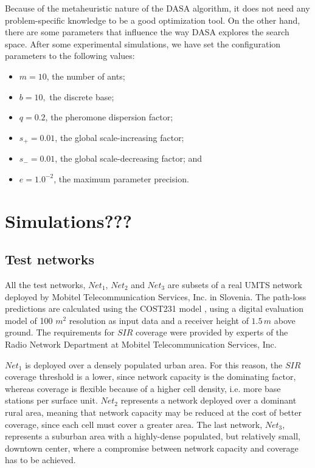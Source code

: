 Because of the metaheuristic nature of the DASA algorithm, it does
not need any problem-specific knowledge to be a good optimization
tool. On the other hand, there are some parameters that influence
the way DASA explores the search space. After some experimental simulations,
we have set the configuration parameters to the following values:
\begin{itemize}
\item $m=10$, the number of ants;
\item $b=10,$ the discrete base;
\item $q=0.2$, the pheromone dispersion factor;
\item $s_{+}=0.01$, the global scale-increasing factor;
\item $s_{-}=0.01$, the global scale-decreasing factor; and 
\item $e=1.0^{-2}$, the maximum parameter precision.
\end{itemize}

\section{Simulations???}


\subsection{Test networks}

All the test networks, $Net_{1}$, $Net_{2}$ and $Net_{3}$ are subsets
of a real UMTS network deployed by Mobitel Telecommunication Services,
Inc. in Slovenia. The path-loss predictions are calculated using the
COST231 model \cite{Cichon_Propagation.prediction.models:1995}, using
a digital evaluation model of 100 $m^{2}$ resolution as input data
and a receiver height of $1.5\, m$ above ground. The requirements
for $SIR$ coverage were provided by experts of the Radio Network
Department at Mobitel Telecommunication Services, Inc.

$Net_{1}$ is deployed over a densely populated urban area. For this
reason, the $SIR$ coverage threshold is a lower, since network capacity
is the dominating factor, whereas coverage is flexible because of
a higher cell density, i.e. more base stations per surface unit. $Net_{2}$
represents a network deployed over a dominant rural area, meaning
that network capacity may be reduced at the cost of better coverage,
since each cell must cover a greater area. The last network, $Net_{3}$,
represents a suburban area with a highly-dense populated, but relatively
small, downtown center, where a compromise between network capacity
and coverage has to be achieved.

